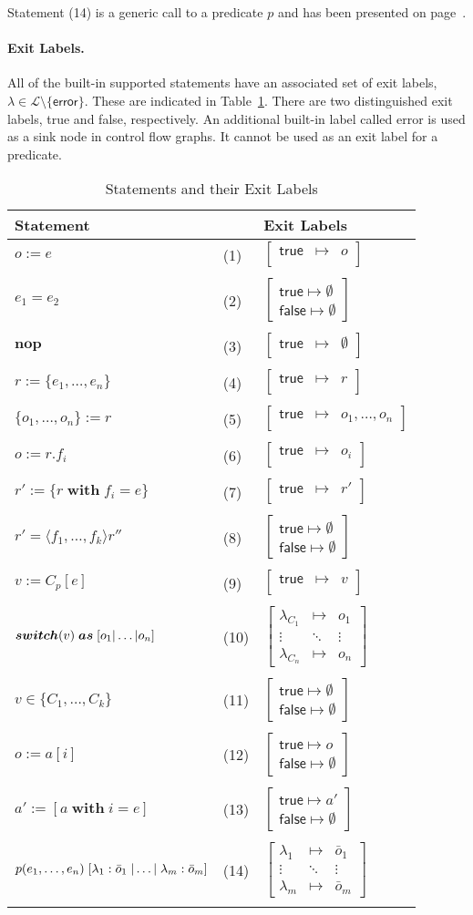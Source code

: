 \documentclass[11pt]{article}
\newcommand{\snumber}[1]{\textrm{{\scriptsize(#1)}}}
\def\lbtrue{\textsf{true}}
\def\lbfalse{\textsf{false}}
\def\unop{\ensuremath{\boldsymbol{nop}}}
\newcommand{\plainasgn}[2]{\ensuremath{#1 := #2}}
\def\commonasgn{\plainasgn{o}{e}}
\newcommand{\plaineqtest}[2]{\ensuremath{#1 = #2}}
\def\commoneqtest{\plaineqtest{e_1}{e_2}}
\newcommand{\recordnew}{r := \{e_1, \ldots, e_n \}}
\newcommand{\recordall}{\{o_1, \ldots, o_n \} := r}
\newcommand{\recordset}{r' := \{r\; \boldsymbol{with}\; f_i = e \} }
\newcommand{\recordget}{o := r.f_i}
\newcommand{\recordeq}{r' = \langle  f_1, \ldots, f_k \rangle r''}
\newcommand{\varcons}{v := C_p[e]}
\newcommand{\varswitch}
{\boldsymbol{switch}(v) \;\boldsymbol{as} \;[o_1 \arrowvert \ldots \arrowvert o_n ]}
\newcommand{\varpossible}{v \in \{ C_1,\ldots ,C_k \}}
\newcommand{\arrayget}{o := a[i]}
\newcommand{\arrayset}{a' := [a \; \boldsymbol{with} \; i = e]}
\newcommand{\predcall}
{p(e_1, \ldots, e_n) \; [\lambda_1: \bar{o}_1 \; \arrowvert \ldots \arrowvert \; \lambda_m: \bar{o}_m]}
\def\lbtrue{\textsf{true}}
\def\lbfalse{\textsf{false}}
\newcommand{\unary}[1]{\left[\begin{array}{ccc}
              \lbtrue &\mapsto &#1\\
              \end{array}
       \right]}
\newcommand{\lbinary}[2]{
  \left[\begin{array}{c}
      \lbtrue \mapsto #1\\ 
      \lbfalse \mapsto #2
    \end{array}\right]
}
\newcommand{\multi}[4]{\left[\begin{array}{ccc}
              \lambda_{#1} &\mapsto & \bar{o}_{1}\\
               \vdots   &\ddots &\vdots \\
              \lambda_{#2} &\mapsto & \bar{o}_{#4}
              \end{array}
       \right]}
\newcommand{\multiv}[3]{\left[\begin{array}{ccc}
              \lambda_{#1} &\mapsto &o_{1}\\
               \vdots   &\ddots &\vdots \\
              \lambda_{#2} &\mapsto &o_{#3}
              \end{array}
       \right]}
\begin{document}
Statement \snumber{14} is a generic call to a predicate $p$ and has been presented
on page~\pageref{ch4:predcall:def}.

\paragraph{Exit Labels.} All of the built-in supported statements have an 
associated set of exit labels, $\lambda \in \mathcal{L}\setminus\{\textsf{error}\}$. 
These are indicated in Table~\ref{mysmil:elabel}. There are two distinguished 
exit labels, {\lbtrue} and {\lbfalse}, respectively. An additional built-in label 
called \textsf{error} is used as a sink node in control flow graphs. It cannot be 
used as an exit label for a predicate. 

\begin{longtable}{lll}
\caption{Statements and their Exit Labels}
\label{mysmil:elabel}\\
\toprule
\textrm{\textsf{Statement}} & &\textrm{\textsf{Exit Labels}} \\
\midrule
$\commonasgn$   &\snumber{1}  &$\unary{o}$\\\\
$\commoneqtest$ &\snumber{2}  &$\lbinary{\emptyset}{\emptyset}$\\\\
$\unop$         &\snumber{3}  &$\unary{\emptyset}$\\\\
$\recordnew$    &\snumber{4}  &$\unary{r}$\\\\
$\recordall$    &\snumber{5}  &$\unary{o_1,\ldots ,o_n}$\\\\
$\recordget$    &\snumber{6}  &$\unary{o_i}$\\\\
$\recordset$    &\snumber{7}  &$\unary{r'}$\\\\
$\recordeq$     &\snumber{8}  &$\lbinary{\emptyset}{\emptyset}$\\\\
$\varcons$      &\snumber{9}  &$\unary{v}$\\\\ 
$\varswitch$    &\snumber{10} &$\multiv{C_1}{C_n}{n}$ \\\\
$\varpossible$  &\snumber{11} &$\lbinary{\emptyset}{\emptyset}$\\\\
$\arrayget$     &\snumber{12} &$\lbinary{o}{\emptyset}$\\\\
$\arrayset$     &\snumber{13} &$\lbinary{a'}{\emptyset}$\\\\
$\predcall$     &\snumber{14} &$\multi{1}{m}{k}{m}$\\\\
\bottomrule
\end{longtable} 
\end{document}
